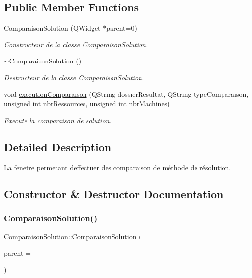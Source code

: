 \subsection*{Public Member Functions}
\begin{DoxyCompactItemize}
\item 
\hyperlink{classComparaisonSolution_a7fc9723f5a627d53e331719c3f47c7cc}{Comparaison\+Solution} (Q\+Widget $\ast$parent=0)
\begin{DoxyCompactList}\small\item\em Constructeur de la classe \hyperlink{classComparaisonSolution}{Comparaison\+Solution}. \end{DoxyCompactList}\item 
\hyperlink{classComparaisonSolution_a07a910b473173981273789934cf34e7f}{$\sim$\+Comparaison\+Solution} ()
\begin{DoxyCompactList}\small\item\em Destructeur de la classe \hyperlink{classComparaisonSolution}{Comparaison\+Solution}. \end{DoxyCompactList}\item 
void \hyperlink{classComparaisonSolution_a973538f344027840ecf5a7f6b254de69}{execution\+Comparaison} (Q\+String dossier\+Resultat, Q\+String type\+Comparaison, unsigned int nbr\+Ressources, unsigned int nbr\+Machines)
\begin{DoxyCompactList}\small\item\em Execute la comparaison de solution. \end{DoxyCompactList}\end{DoxyCompactItemize}


\subsection{Detailed Description}
La fenetre permetant d\textquotesingle{}effectuer des comparaison de méthode de résolution. 

\subsection{Constructor \& Destructor Documentation}
\mbox{\label{classComparaisonSolution_a7fc9723f5a627d53e331719c3f47c7cc}} 
\subsubsection{\texorpdfstring{Comparaison\+Solution()}{ComparaisonSolution()}}
{\footnotesize\ttfamily Comparaison\+Solution\+::\+Comparaison\+Solution (\begin{DoxyParamCaption}\item[{Q\+Widget $\ast$}]{parent = {} }\end{DoxyParamCaption})\hspace{0.3cm}{\ttfamily [explicit]}}



